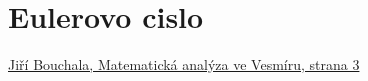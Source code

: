 \documentclass[12pt]{book}
\begin{document}


\chapter{Eulerovo cislo}

\begin{thebibliography}{2}
	 \href{https://homel.vsb.cz/~bou10/MA1/4.pdf}{Jiří Bouchala, Matematická analýza ve Vesmíru, strana 3}
\end{thebibliography}
\end{document}
